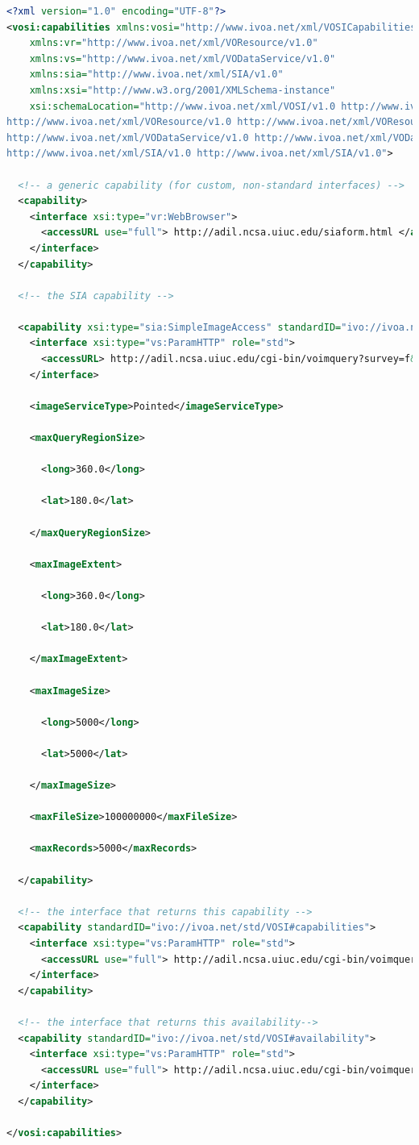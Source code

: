 \documentclass[11pt,letter]{ivoa}
\begin{document}
\begin{lstlisting}[language=XML]
<?xml version="1.0" encoding="UTF-8"?>
<vosi:capabilities xmlns:vosi="http://www.ivoa.net/xml/VOSICapabilities/v1.0"
    xmlns:vr="http://www.ivoa.net/xml/VOResource/v1.0"
    xmlns:vs="http://www.ivoa.net/xml/VODataService/v1.0"
    xmlns:sia="http://www.ivoa.net/xml/SIA/v1.0"
    xmlns:xsi="http://www.w3.org/2001/XMLSchema-instance"
    xsi:schemaLocation="http://www.ivoa.net/xml/VOSI/v1.0 http://www.ivoa.net/xml/VOSI/v1.0
http://www.ivoa.net/xml/VOResource/v1.0 http://www.ivoa.net/xml/VOResource/v1.0
http://www.ivoa.net/xml/VODataService/v1.0 http://www.ivoa.net/xml/VODataService/v1.0
http://www.ivoa.net/xml/SIA/v1.0 http://www.ivoa.net/xml/SIA/v1.0">

  <!-- a generic capability (for custom, non-standard interfaces) -->
  <capability>
    <interface xsi:type="vr:WebBrowser">
      <accessURL use="full"> http://adil.ncsa.uiuc.edu/siaform.html </accessURL>
    </interface>
  </capability>
  
  <!-- the SIA capability -->
 
  <capability xsi:type="sia:SimpleImageAccess" standardID="ivo://ivoa.net/std/SIA">
    <interface xsi:type="vs:ParamHTTP" role="std">
      <accessURL> http://adil.ncsa.uiuc.edu/cgi-bin/voimquery?survey=f&amp; </accessURL>
    </interface>

    <imageServiceType>Pointed</imageServiceType>

    <maxQueryRegionSize>

      <long>360.0</long>

      <lat>180.0</lat>

    </maxQueryRegionSize>

    <maxImageExtent>

      <long>360.0</long>

      <lat>180.0</lat>

    </maxImageExtent>

    <maxImageSize>

      <long>5000</long>

      <lat>5000</lat>

    </maxImageSize>

    <maxFileSize>100000000</maxFileSize>

    <maxRecords>5000</maxRecords>

  </capability>

  <!-- the interface that returns this capability -->
  <capability standardID="ivo://ivoa.net/std/VOSI#capabilities">
    <interface xsi:type="vs:ParamHTTP" role="std">
      <accessURL use="full"> http://adil.ncsa.uiuc.edu/cgi-bin/voimquery/capabilities </accessURL>
    </interface>
  </capability>

  <!-- the interface that returns this availability-->
  <capability standardID="ivo://ivoa.net/std/VOSI#availability">
    <interface xsi:type="vs:ParamHTTP" role="std">
      <accessURL use="full"> http://adil.ncsa.uiuc.edu/cgi-bin/voimquery/availability </accessURL>
    </interface>
  </capability>

</vosi:capabilities>
\end{lstlisting}
\end{document}
